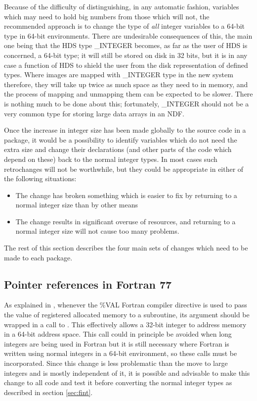 \documentclass[twoside,11pt,nolof]{starlink}
\begin{document}
Because of the difficulty of distinguishing, in any automatic fashion,
variables which may
need to hold big numbers from those which will not,
the recommended approach is to change the type of \emph{all\/}
integer variables to a 64-bit type in 64-bit environments.
There are undesirable consequences of this,
the main one being that
the HDS type \_INTEGER becomes, as far as the user of HDS is concerned,
a 64-bit type;
it will still be stored on disk in 32 bits, but it is in any case a
function of HDS to shield the user from the disk representation
of defined types.
Where images are mapped with \_INTEGER type in the new system therefore,
they will take up twice as much space as they need to in memory,
and the process of mapping and unmapping them can be expected to be slower.
There is nothing much to be done about this;
fortunately, \_INTEGER should not be a very common type for
storing large data arrays in an NDF.

Once the increase in integer size has been made
globally to the source code in a package,
it would be a possibility
to identify variables which do not need the extra size
and change their declarations (and other parts of the code which depend
on these) back to the normal integer types.
In most cases such retrochanges will not be worthwhile,
but they could be appropriate in either of the following situations:
\begin{itemize}
\item
The change has broken something which is easier to fix by returning to
a normal integer size than by other means
\item
The change results in significant overuse of resources,
and returning to a normal
integer size will not cause too many problems.
\end{itemize}

The rest of this section describes the four main sets of changes
which need to be made to each package.

\subsection{Pointer references in Fortran 77}

As explained in ,
whenever the \%VAL Fortran compiler directive
is used to pass the value of registered allocated
memory to a subroutine, its argument should be wrapped in a call
to .  This effectively allows
a 32-bit integer to address memory in a 64-bit address space.
This call could in principle be avoided
when long integers are being used in Fortran
but it is still
necessary where Fortran is written using normal integers in a
64-bit environment,
so these calls must be incorporated.
Since this change is less problematic than the move to large integers
and is mostly independent of it,
it is possible and advisable to make this
change to all code and test it before converting the normal integer types
as described in section \ref{sec:fint}.
\end{document}
